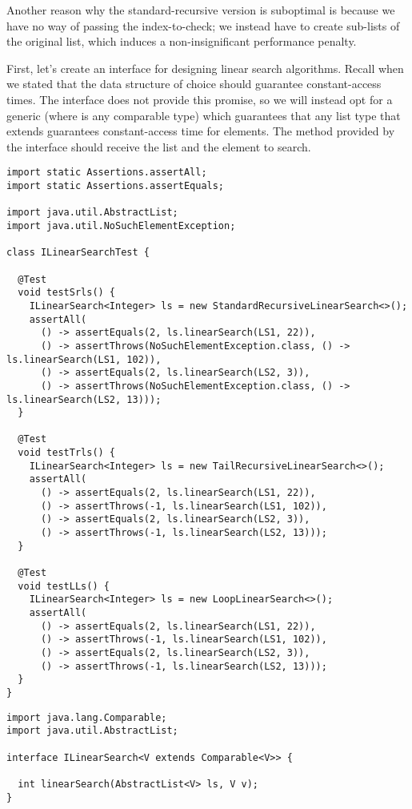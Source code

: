Another reason why the standard-recursive version is suboptimal is because we have no way of passing the index-to-check; we instead have to create sub-lists of the original list, which induces a non-insignificant performance penalty.

First, let's create an interface for designing linear search algorithms. 
Recall when we stated that the data structure of choice should guarantee constant-access times. 
The  interface does not provide this promise, so we will instead opt for a generic  (where  is any comparable type) which guarantees that any list type that extends  guarantees constant-access time for elements. 
The method provided by the interface should receive the list and the element to search.

\enlargethispage{-1\baselineskip}
\begin{lstlisting}[language=MyJava]
import static Assertions.assertAll;
import static Assertions.assertEquals;

import java.util.AbstractList;
import java.util.NoSuchElementException;

class ILinearSearchTest {

  @Test
  void testSrls() {
    ILinearSearch<Integer> ls = new StandardRecursiveLinearSearch<>();
    assertAll(
      () -> assertEquals(2, ls.linearSearch(LS1, 22)),
      () -> assertThrows(NoSuchElementException.class, () -> ls.linearSearch(LS1, 102)),
      () -> assertEquals(2, ls.linearSearch(LS2, 3)),
      () -> assertThrows(NoSuchElementException.class, () -> ls.linearSearch(LS2, 13)));
  }

  @Test
  void testTrls() {
    ILinearSearch<Integer> ls = new TailRecursiveLinearSearch<>();
    assertAll(
      () -> assertEquals(2, ls.linearSearch(LS1, 22)),
      () -> assertThrows(-1, ls.linearSearch(LS1, 102)),
      () -> assertEquals(2, ls.linearSearch(LS2, 3)),
      () -> assertThrows(-1, ls.linearSearch(LS2, 13)));
  }

  @Test
  void testLLs() {
    ILinearSearch<Integer> ls = new LoopLinearSearch<>();
    assertAll(
      () -> assertEquals(2, ls.linearSearch(LS1, 22)),
      () -> assertThrows(-1, ls.linearSearch(LS1, 102)),
      () -> assertEquals(2, ls.linearSearch(LS2, 3)),
      () -> assertThrows(-1, ls.linearSearch(LS2, 13)));
  }
}
\end{lstlisting}

\begin{lstlisting}[language=MyJava]
import java.lang.Comparable;
import java.util.AbstractList;

interface ILinearSearch<V extends Comparable<V>> {
  
  int linearSearch(AbstractList<V> ls, V v);
}
\end{lstlisting}

